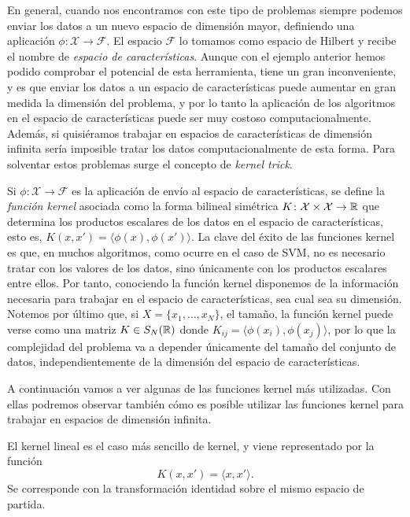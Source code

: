 En general, cuando nos encontramos con este tipo de problemas siempre podemos enviar los datos a un nuevo espacio de dimensión mayor, definiendo una aplicación $\phi\colon \mathcal{X} \to \mathcal{F}$. El espacio $\mathcal{F}$ lo tomamos como espacio de Hilbert y recibe el nombre de \emph{espacio de características}. Aunque con el ejemplo anterior hemos podido comprobar el potencial de esta herramienta, tiene un gran inconveniente, y es que enviar los datos a un espacio de características puede aumentar en gran medida la dimensión del problema, y por lo tanto la aplicación de los algoritmos en el espacio de características puede ser muy costoso computacionalmente. Además, si quisiéramos trabajar en espacios de características de dimensión infinita sería imposible tratar los datos computacionalmente de esta forma. Para solventar estos problemas surge el concepto de \emph{kernel trick}.

Si $\phi\colon \mathcal{X} \to \mathcal{F}$ es la aplicación de envío al espacio de características, se define la \emph{función kernel} asociada como la forma bilineal simétrica $K \colon \mathcal{X} \times \mathcal{X} \to \mathbb{R}$ que determina los productos escalares de los datos en el espacio de características, esto es,
$K(x,x') = \langle \phi(x), \phi(x') \rangle$. La clave del éxito de las funciones kernel es que, en muchos algoritmos, como ocurre en el caso de SVM, no es necesario tratar con los valores de los datos, sino únicamente con los productos escalares entre ellos. Por tanto, conociendo la función kernel disponemos de la información necesaria para trabajar en el espacio de características, sea cual sea su dimensión. Notemos por último que, si $X = \{x_1,\dots,x_N\}$, el tamaño, la función kernel puede verse como una matriz $K \in S_N(\mathbb{R})$ donde $K_{ij} = \langle \phi(x_i), \phi(x_j) \rangle$, por lo que la complejidad del problema va a depender únicamente del tamaño del conjunto de datos, independientemente de la dimensión del espacio de características.

A continuación vamos a ver algunas de las funciones kernel más utilizadas. Con ellas podremos observar también cómo es posible utilizar las funciones kernel para trabajar en espacios de dimensión infinita.

\begin{ex}
    El kernel lineal es el caso más sencillo de kernel, y viene representado por la función
    \[ K(x,x') = \langle x, x' \rangle. \]
    Se corresponde con la transformación identidad sobre el mismo espacio de partida.
\end{ex}

